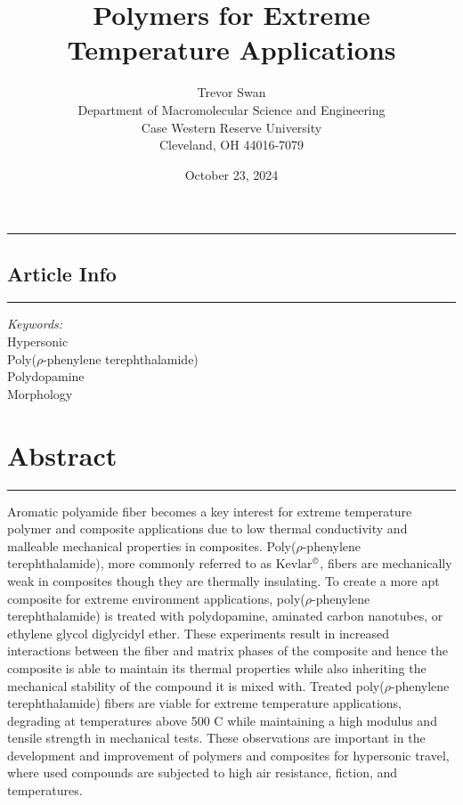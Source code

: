 \documentclass[12pt]{article}
\title{\textbf{Polymers for Extreme Temperature Applications}}
\author{Trevor Swan \\
Department of Macromolecular Science and Engineering \\ 
Case Western Reserve University \\
Cleveland, OH 44016-7079}
\date{October 23, 2024}
\begin{document}
\maketitle

\hrule height 1pt
\vspace{1em}

\noindent %
\begin{minipage}[t]{0.2\textwidth}
    \subsection*{Article Info}
    \vspace{-0.5em}
    \hrule height 1pt
    \vspace{0.5em}
    \textit{Keywords:}\\
    	Hypersonic\\
        Poly($\rho$-phenylene terephthalamide)\\
        Polydopamine\\
    	Morphology
\end{minipage}%
\hfill %
\begin{minipage}[t]{0.75\textwidth}
    \section*{Abstract}
    \vspace{-0.97em}
    \hrule height 1pt
    \vspace{0.5em}
    Aromatic polyamide fiber becomes a key interest for extreme temperature polymer and composite applications due to low thermal conductivity and malleable mechanical properties in composites. Poly($\rho$-phenylene terephthalamide), more commonly referred to as Kevlar$^{\text{\textcopyright}}$, fibers are mechanically weak in composites though they are thermally insulating. To create a more apt composite for extreme environment applications, poly($\rho$-phenylene terephthalamide) is treated with polydopamine, aminated carbon nanotubes, or ethylene glycol diglycidyl ether. These experiments result in increased interactions between the fiber and matrix phases of the composite and hence the composite is able to maintain its thermal properties while also inheriting the mechanical stability of the compound it is mixed with. Treated poly($\rho$-phenylene terephthalamide) fibers are viable for extreme temperature applications, degrading at temperatures above 500 \degree C while maintaining a high modulus and tensile strength in mechanical tests. These observations are important in the development and improvement of polymers and composites for hypersonic travel, where used compounds are subjected to high air resistance, fiction, and temperatures.
    
\end{minipage}
\end{document}
